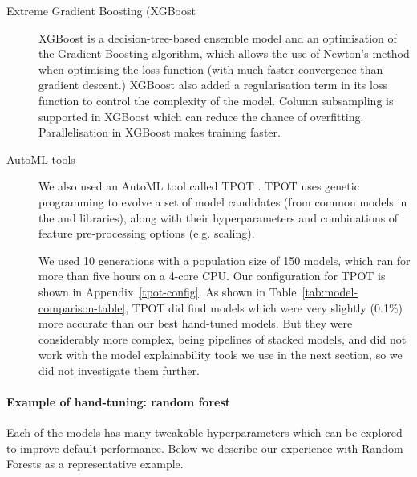 \begin{description}
\item[Extreme Gradient Boosting (XGBoost]  XGBoost \cite{chen2016xgboost} is a decision-tree-based ensemble model and an optimisation of the Gradient Boosting algorithm, which allows the use of Newton's method when optimising the loss function (with much faster convergence than gradient descent.) XGBoost also added a regularisation term in its loss function to control the complexity of the model. Column subsampling is supported in XGBoost which can reduce the chance of overfitting. Parallelisation in XGBoost makes training faster.

\item[AutoML tools]
\label{sec:automl}
We also used an AutoML tool called TPOT \cite{tpot-automl}. TPOT uses genetic programming to evolve a set of model candidates (from common models in the  and  libraries), along with their hyperparameters and combinations of feature pre-processing options (e.g. scaling). 

We used 10 generations with a population size of 150 models, which ran for more than five hours on a 4-core CPU. Our configuration for TPOT is shown in Appendix\ \ref{tpot-config}. As shown in Table\ \ref{tab:model-comparison-table}, TPOT did find models which were very slightly (0.1\%) more accurate than our best hand-tuned models. But they were considerably more complex, being pipelines of stacked models, and did not work with the model explainability tools we use in the next section, so we did not investigate them further.
\end{description}

\paragraph{Example of hand-tuning: random forest}
Each of the models has many tweakable hyperparameters which can be explored to improve default performance. Below we describe our experience with Random Forests as a representative example. 

